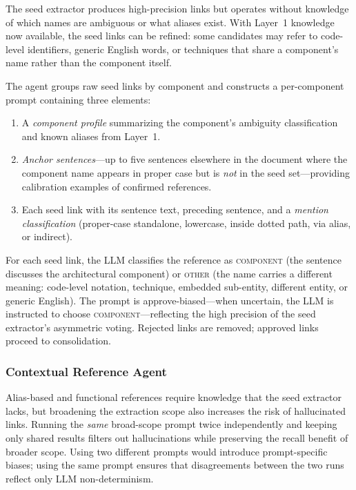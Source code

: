The seed extractor produces high-precision links but operates without
knowledge of which names are ambiguous or what aliases exist.
With Layer~1 knowledge now available, the seed links can be refined:
some candidates may refer to code-level identifiers, generic English
words, or techniques that share a component's name rather than the
component itself.

The agent groups raw seed links by component and constructs a
per-component prompt containing three elements:
\begin{enumerate}
  \item A \emph{component profile} summarizing the component's
    ambiguity classification and known aliases from Layer~1.
  \item \emph{Anchor sentences}---up to five sentences elsewhere in the
    document where the component name appears in proper case but is
    \emph{not} in the seed set---providing calibration examples of
    confirmed references.
  \item Each seed link with its sentence text, preceding sentence, and
    a \emph{mention classification} (proper-case standalone,
    lowercase, inside dotted path, via alias, or indirect).
\end{enumerate}

For each seed link, the LLM classifies the reference as
\textsc{component} (the sentence discusses the architectural
component) or \textsc{other} (the name carries a different meaning:
code-level notation, technique, embedded sub-entity, different entity,
or generic English).
The prompt is approve-biased---when uncertain, the LLM is instructed
to choose \textsc{component}---reflecting the high precision of the
seed extractor's asymmetric voting.
Rejected links are removed; approved links proceed to consolidation.

\subsubsection{Contextual Reference Agent}\label{sec:entity}

Alias-based and functional references require knowledge that the
seed extractor lacks, but broadening the extraction scope also
increases the risk of hallucinated links.
Running the \emph{same} broad-scope prompt twice independently
and keeping only shared results filters out hallucinations while
preserving the recall benefit of broader scope.
Using two different prompts would introduce prompt-specific biases;
using the same prompt ensures that disagreements between the two
runs reflect only LLM non-determinism.

